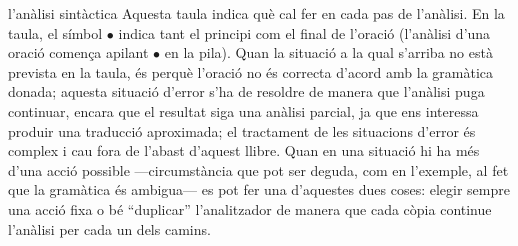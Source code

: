 \begin{persabermes}{l'anàlisi sintàctica}
  Aquesta taula indica què cal fer en cada pas de l'anàlisi. En la
  taula, el símbol $\bullet$ indica tant el principi com el final de
  l'oració (l'anàlisi d'una oració comença apilant $\bullet$ en la
  pila). Quan la situació a la qual s'arriba no està prevista en la
  taula, és perquè l'oració no és correcta d'acord amb la gramàtica
  donada; aquesta situació d'error s'ha de resoldre de manera que
  l'anàlisi puga continuar, encara que el resultat siga una anàlisi
  parcial, ja que ens interessa produir una traducció aproximada; el
  tractament de les situacions d'error és complex i cau fora de
  l'abast d'aquest llibre. Quan en una situació hi ha més d'una acció
  possible ---circumstància que pot ser deguda, com en l'exemple, al
  fet que la gramàtica és ambigua--- es pot fer una d'aquestes dues
  coses: elegir sempre una acció fixa o bé ``duplicar'' l'analitzador
  de manera que cada còpia continue l'anàlisi per cada un dels camins.


\end{persabermes}
